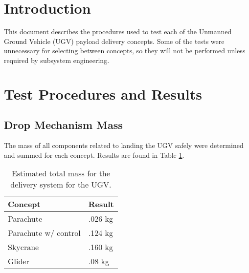\documentclass[]{auvsi_doc}
\begin{document}
\begin{AUVSITitlePage}
\begin{artifacttable}

\end{artifacttable}
\end{AUVSITitlePage}

\section{Introduction}
This document describes the procedures used to test each of the Unmanned Ground Vehicle (UGV) payload delivery concepts.
Some of the tests were unnecessary for selecting between concepts, so they will not be performed unless required by subsystem engineering.

\section {Test Procedures and Results}
	\subsection{Drop Mechanism Mass}

	The mass of all components related to landing the UGV safely were determined and summed for each concept. Results are found in Table \ref{mass}.


	\begin{table}[!h]
	\centering
	
	\caption{Estimated total mass for the delivery system for the UGV.}
\label{mass}
	\begin{tabular}{|l|l|}
		\hline
		\rowcolor[HTML]{C0C0C0}
		\textbf{Concept}       & \textbf{Result} \\
		\hline
		Parachute              & .026 kg                \\
		Parachute w/ control   & .124 kg                \\
		Skycrane               & .160 kg                \\
		Glider                 & .08 kg				 \\
		\hline
	\end{tabular}
	\end{table}
\end{document}
